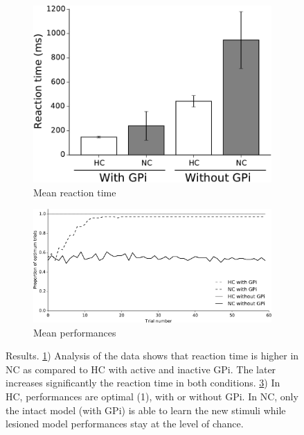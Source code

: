\begin{figure}[h]
        \centering
        \begin{subfigure}[b]{0.4\textwidth}
                \includegraphics[width=\textwidth]{RTresults}

        		  \vspace{2mm}
                \caption{Mean reaction time}
                \label{fig:RTresults}
        \end{subfigure}
        \vspace{4mm}

        \begin{subfigure}[b]{0.9\textwidth}
                \includegraphics[width=\textwidth]{Performances}
        		  \vspace{2mm}
                \caption{Mean performances}
                \label{fig:Performances}
        \end{subfigure}
        \vspace{4mm}
        \caption{Results. \ref{fig:RTresults}) Analysis of the data shows that
          reaction time is higher in NC as compared to HC with active and
          inactive GPi. The later increases significantly the reaction time in
          both conditions.  \ref{fig:Performances}) In HC, performances are
          optimal (1), with or without GPi. In NC, only the intact model (with
          GPi) is able to learn the new stimuli while lesioned model
          performances stay at the level of chance.}
\end{figure}
